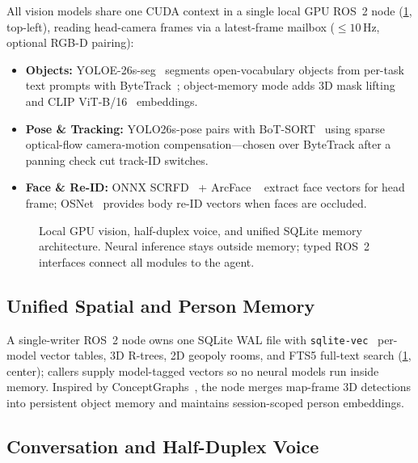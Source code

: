 \documentclass[a4paper]{llncs}
\begin{document}
All vision models share one CUDA context in a single local GPU ROS~2 node (\cref{fig:vision-memory}, top-left), reading head-camera frames via a latest-frame mailbox ($\le 10$\,Hz, optional RGB-D pairing):
\begin{itemize}[noitemsep,topsep=1pt]
  \item \textbf{Objects:} YOLOE-26s-seg~\cite{wang2025yoloe} segments open-vocabulary objects from per-task text prompts with ByteTrack~\cite{zhang2022bytetrack}; object-memory mode adds 3D mask lifting and CLIP ViT-B/16~\cite{radford2021learningtransferablevisualmodels} embeddings.
  \item \textbf{Pose \& Tracking:} YOLO26s-pose pairs with BoT-SORT~\cite{aharon2022botsort} using sparse optical-flow camera-motion compensation---chosen over ByteTrack after a panning check cut track-ID switches.
  \item \textbf{Face \& Re-ID:} ONNX SCRFD~\cite{guo2022scrfd} + ArcFace ~\cite{deng2019arcface} extract face vectors for head frame; OSNet~\cite{zhou2019osnet} provides body re-ID vectors when faces are occluded.
\end{itemize}

\begin{figure}[tb]
  \centering
  \resizebox{0.89\textwidth}{!}{}
  \caption{Local GPU vision, half-duplex voice, and unified SQLite memory architecture. Neural inference stays outside memory; typed ROS~2 interfaces connect all modules to the agent.}
  \label{fig:vision-memory}
\end{figure}

\subsection{Unified Spatial and Person Memory}
\label{sec:memory}

A single-writer ROS~2 node owns one SQLite WAL file with \texttt{sqlite-vec}~\cite{garcia2024sqlitevec} per-model vector tables, 3D R-trees, 2D geopoly rooms, and FTS5 full-text search (\cref{fig:vision-memory}, center); callers supply model-tagged vectors so no neural models run inside memory. Inspired by ConceptGraphs~\cite{gu2024conceptgraphs}, the node merges map-frame 3D detections into persistent object memory and maintains session-scoped person embeddings.

\subsection{Conversation and Half-Duplex Voice}
\label{sec:conversation}
\end{document}
